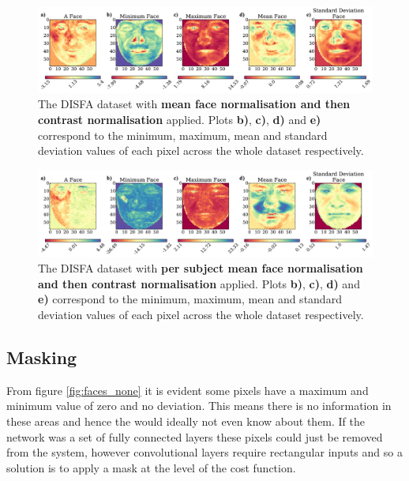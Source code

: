       \begin{figure}[!h] \centering
      \includegraphics[width =\hsize]{figures/faces_contrast_face.pdf}
      \caption{The DISFA dataset with {\bf mean face normalisation and then contrast normalisation} applied.
      Plots {\bf b)}, {\bf c)}, {\bf d)} and {\bf e)} correspond to the minimum,
      maximum, mean and standard deviation values of each pixel across the whole
      dataset respectively.} \label{fig:faces_contrast_face} \end{figure}

      \begin{figure}[!h] \centering
      \includegraphics[width =\hsize]{figures/faces_per_subject_contrast_face.pdf}
      \caption{The DISFA dataset with {\bf per subject mean face normalisation and then contrast normalisation} applied.
      Plots {\bf b)}, {\bf c)}, {\bf d)} and {\bf e)} correspond to the minimum,
      maximum, mean and standard deviation values of each pixel across the whole
      dataset respectively.} \label{fig:faces_per_subject_contrast_face} \end{figure}

    \subsection{Masking}
      From figure \ref{fig:faces_none} it is evident some pixels have a maximum and minimum value
      of zero and no deviation. This means there is no information in these areas and hence
      the would ideally not even know about them. If the network was a set of fully connected layers
      these pixels could just be removed from the system, however convolutional layers require
      rectangular inputs and so a solution is to apply a mask at the level of the cost function.

